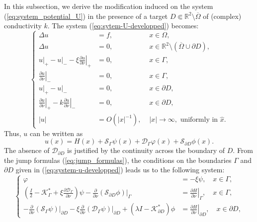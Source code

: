 \documentclass[final]{siamltex}
\numberwithin{equation}{section}
\numberwithin{figure}{section}
\numberwithin{table}{section}
\begin{document}
In this subsection, we derive the modification induced on the
system (\ref{eq:system_potential_U}) in the presence of a target
$D \Subset \mathbb{R}^{2}\setminus \overline{\Omega}$ of (complex)
conductivity $k$. The system (\ref{eq:sytem-U-developped})
becomes:
\begin{equation}
\left\{ \begin{alignedat}{2}\Delta u & ={f}, & \,\, x\in\Omega,\\
\Delta u & =0, & \,\, x\in\mathbb{R}^{2}\setminus\left(\overline{\Omega}\cup\partial D\right),\\
u\big|_+ - u \big|_- -\xi\left.\frac{\partial u}{\partial\nu}\right|_{+} & =0, & \,\, x\in\Gamma,\\
\left.\frac{\partial u}{\partial\nu}\right|_{-} & =0, & \,\, x\in\Gamma,\\
{}u\big|_+ - u \big|_-  & =0, & \,\, x\in \partial D,\\
\left.\frac{\partial
u}{\partial\nu}\right|_{+}-k\left.\frac{\partial
u}{\partial\nu}\right|_{-} & =0, & \,\, x\in \partial
D,\\
\left|u\right| & = {O}(\left|x\right|^{-1}), &
\,\,\left|x\right|\rightarrow\infty,\text{ uniformly in }\hat{x}.
\end{alignedat}
\right.\label{eq:system-u-developped}
\end{equation}
Thus, $u$ can be written as
\[
u(x)=H(x)+\mathcal{S}_{\Gamma}\psi(x)+\mathcal{D}_{\Gamma}\varphi(x)+\mathcal{S}_{\partial
D}\phi(x).
\]
The absence of $\mathcal{D}_{\partial D}$ is justified by the
continuity across the boundary of $D$. From the jump formulas
(\ref{eq:jump_formulas}), the conditions on the boundaries
$\Gamma$ and $\partial D$ given in (\ref{eq:system-u-developped})
leads us to the following system:
\begin{equation}
\left\{ \begin{alignedat}{1}\varphi & =-\xi\psi, \quad x \in \Gamma, \\
\left(\frac{I}{2}-\mathcal{K}_{\Gamma}^{*}+\xi\frac{\partial\mathcal{D}_{\Gamma}}{\partial\nu}\right)\psi
-\frac{\partial}{\partial\nu}\left.\left(\mathcal{S}_{\partial
D}\phi\right)\right|_{\Gamma} &
=\left.\frac{\partial H}{\partial\nu}\right|_{\Gamma}, \quad x \in \Gamma, \\
-\frac{\partial}{\partial\nu}\left.\left(\mathcal{S}_{\Gamma}\psi\right)\right|_{\partial
D}-\xi\frac{\partial}{\partial\nu}\left.\left(\mathcal{D}_{\Gamma}\psi\right)\right|_{\partial
D}+\left(\lambda I-\mathcal{K}_{\partial D}^{*}\right)\phi &
=\left.\frac{\partial H}{\partial\nu}\right|_{\partial D}, \quad x
\in \partial D,
\end{alignedat}
\right.\label{eq:system-potentials-anomaly}
\end{equation}
\end{document}
